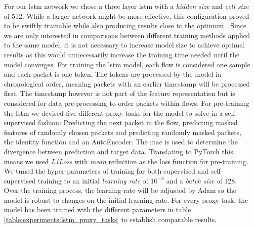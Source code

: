 For our \gls{lstm} network we chose a three layer \gls{lstm} with a \textit{hidden size} and \textit{cell size} of 512. While a larger network might be more effective, this configuration proved to be swiftly trainable while also producing results close to the optimum . Since we are only interested in comparisons between different training methods applied to the same model, it is not necessary to increase model size to achieve optimal results as this would unnecessarily increase the training time needed until the model converges. For training the \gls{lstm} model, each flow is considered one sample and each packet is one token. The tokens are processed by the model in chronological order, meaning packets with an earlier timestamp will be processed first. The timestamp however is not part of the feature representation but is considered for data pre-processing to order packets within flows. For pre-training the \gls{lstm} we devised five different proxy tasks for the model to solve in a self-supervised fashion: Predicting the next packet in the flow, predicting masked features of randomly chosen packets and predicting randomly masked packets, the identity function and an AutoEncoder. The \gls{mae} is used to determine the divergence between prediction and target data. Translating to PyTorch this means we used \textit{L1Loss} with \textit{mean} reduction as the loss function for pre-training. We tuned the hyper-parameters of training for both supervised and self-supervised training to an initial \textit{learning rate} of $10^{-3}$ and a \textit{batch size} of 128. Over the training process, the learning rate will be adjusted by Adam so the model is robust to changes on the initial learning rate. For every proxy task, the model has been trained with the different parameters in table \ref{table:experiments:lstm_proxy_tasks} to establish comparable results.

